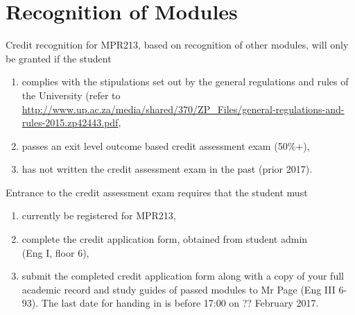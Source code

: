 \newpage
\section{Recognition of Modules} \label{sec:credit_study_guide}
    \noindent
    Credit recognition for MPR213, based on recognition of other modules, will
    only be granted if the student
    \begin{enumerate}
        \item complies with the stipulations set out by the general regulations
            and rules of the University (refer to
            \url{http://www.up.ac.za/media/shared/370/ZP_Files/general-regulations-and-rules-2015.zp42443.pdf},
        \item passes an exit level outcome based credit assessment exam (50\%+),
        \item has not written the credit assessment exam in the past (prior 2017).
    \end{enumerate}

    \noindent
    Entrance to the credit assessment exam requires that the student must
    \begin{enumerate}
        \item currently be registered for MPR213,
        \item complete the credit application form, obtained from student
            admin \\ (Eng I, floor 6),
        \item submit the completed credit application form along with a copy of
            your full academic record and study guides of passed modules to Mr
            Page (Eng III 6-93). The last date for handing in is before 17:00
            on ?? February 2017.
    \end{enumerate}

